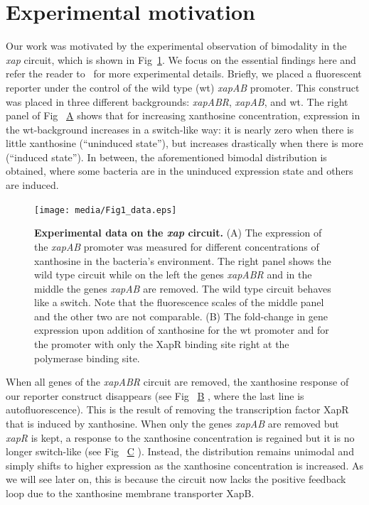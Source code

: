 \documentclass[10pt,letterpaper]{article}
\newcommand\subref[2]{%
	\def\myref{\getrefnumber{#1}}%
	\hyperref[#1]{\myref\mbox{#2}}%
}
\begin{document}
	\section*{Experimental motivation} \label{sec:experiment}
	Our work was motivated by the experimental observation of bimodality
	in the \emph{xap} circuit, which is shown in Fig~\ref{fig1:data}. We
	focus on the essential findings here and refer the reader
	to~ for more experimental details. Briefly, we
	placed a fluorescent reporter under the control of the wild type
	(wt) \emph{xapAB} promoter. This construct was placed in three
	different backgrounds: \textDelta\emph{xapABR},
	\textDelta\emph{xapAB}, and wt. The right panel of
	Fig~\subref{fig1:data}{A} shows that for increasing xanthosine
	concentration, expression in the wt-background increases in a
	switch-like way: it is nearly zero when there is little xanthosine
	(``uninduced state''), but increases drastically when there is more
	(``induced state''). In between, the aforementioned bimodal
	distribution is obtained, where some bacteria are in the uninduced
	expression state and others are induced.
		
	\begin{figure}%
		\centering
		\texttt{[image: media/Fig1\_data.eps]}
		\caption{{\bf Experimental data on the \emph{xap} circuit.}
		(A) The expression of the \emph{xapAB} promoter was measured for
		different concentrations of xanthosine in the bacteria's
		environment. The right panel shows the wild type circuit while
		on the left the genes \emph{xapABR} and in the middle the genes
		\emph{xapAB} are removed. The wild type circuit behaves like a
		switch. Note that the fluorescence scales of the middle panel
		and the other two are not comparable.
		(B) The fold-change in gene expression upon addition of
		xanthosine for the wt promoter and for the promoter with only
		the XapR binding site right at the polymerase binding site.
		}
		\label{fig1:data}
	\end{figure}

	When all genes of the \emph{xapABR} circuit are removed, the xanthosine response of our reporter construct disappears (see Fig~\subref{fig1:data}{B}, where the last line is autofluorescence). This is the result of removing the transcription factor XapR that is induced by xanthosine. When only the genes \emph{xapAB} are removed but \emph{xapR} is kept, a response to the xanthosine concentration is regained but it is no longer switch-like (see Fig~\subref{fig1:data}{C}). Instead, the distribution remains unimodal and simply shifts to higher expression as the xanthosine concentration is increased. As we will see later on, this is because the circuit now lacks the positive feedback loop due to the xanthosine membrane transporter XapB. 
	
\end{document}
